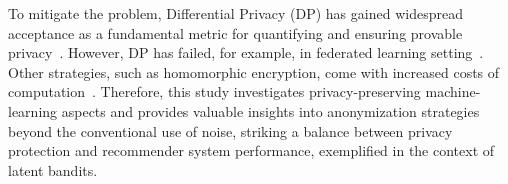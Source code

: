 \documentclass{article}
\begin{document}




To mitigate the problem, Differential Privacy (DP) has gained widespread acceptance as a fundamental metric for quantifying and ensuring provable privacy~\citep{dwork2014algorithmic}. However, DP has failed, for example, in federated learning setting~\citep{wang2021protecting}. Other strategies, such as homomorphic encryption, come with increased costs of computation~\citep{hao2019towards}. %
Therefore, this study investigates privacy-preserving machine-learning aspects and provides valuable insights into anonymization strategies beyond the conventional use of noise, striking a balance between privacy protection and recommender system performance, exemplified in the context of latent bandits. 



\end{document}
